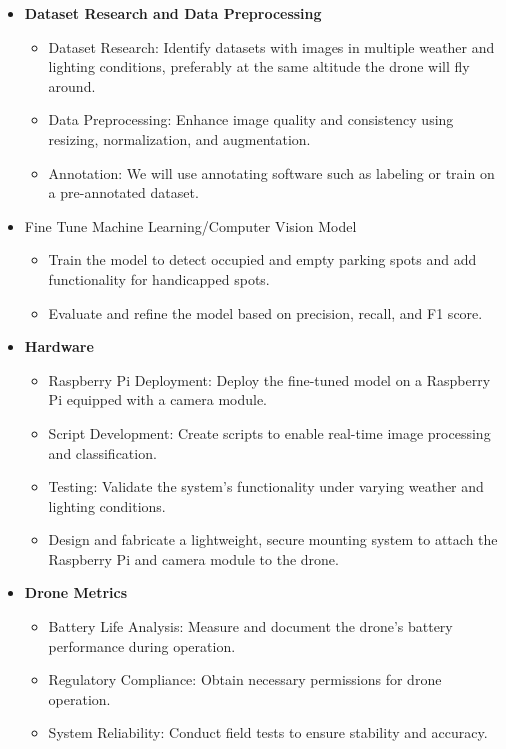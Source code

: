 \documentclass[conference]{IEEEtran}
\begin{document}
\begin{itemize}
    \item \textbf{Dataset Research and Data Preprocessing}
    \begin{itemize}
        \item Dataset Research: Identify datasets with images in multiple weather and lighting conditions, preferably at the same altitude the drone will fly around.
        \item Data Preprocessing: Enhance image quality and consistency using resizing, normalization, and augmentation.
        \item Annotation: We will use annotating software such as labeling or train on a pre-annotated dataset.
    \end{itemize}
    \item Fine Tune Machine Learning/Computer Vision Model
    \begin{itemize}
        \item Train the model to detect occupied and empty parking spots and add functionality for handicapped spots.
        \item Evaluate and refine the model based on precision, recall, and F1 score.
    \end{itemize}
    \item \textbf{Hardware}
    \begin{itemize}
        \item Raspberry Pi Deployment: Deploy the fine-tuned model on a Raspberry Pi equipped with a camera module.
        \item Script Development: Create scripts to enable real-time image processing and classification.
        \item Testing: Validate the system's functionality under varying weather and lighting conditions.
        \item Design and fabricate a lightweight, secure mounting system to attach the Raspberry Pi and camera module to the drone.
    \end{itemize}
    \item \textbf{Drone Metrics}
    \begin{itemize}
        \item Battery Life Analysis: Measure and document the drone's battery performance during operation.
        \item Regulatory Compliance: Obtain necessary permissions for drone operation.
        \item System Reliability: Conduct field tests to ensure stability and accuracy.

\end{itemize}
\end{itemize}
\end{document}
